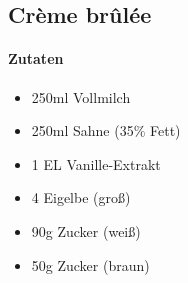 \newpage
\subsection{Crème brûlée}
\paragraph{Zutaten}
\begin{itemize}[noitemsep]
	\item 250ml Vollmilch
	\item 250ml Sahne (35\% Fett)
	\item 1 EL Vanille-Extrakt 
	\item 4 Eigelbe (groß)
	\item 90g Zucker (weiß)
	\item 50g Zucker (braun)
\end{itemize}
